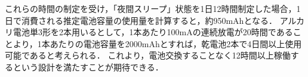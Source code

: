 これらの時間の制定を受け，「夜間スリープ」状態を1日12時間制定した場合，1日で消費される推定電池容量の使用量を計算すると，約950mAhとなる．
アルカリ電池単3形を2本用いるとして，1本あたり100mAの連続放電が20時間\cite{denti}であることより，1本あたりの電池容量を2000mAhとすれば，乾電池2本で4日間以上使用可能であると考えられる．
これより，電池交換することなく12時間以上稼働するという設計を満たすことが期待できる．












